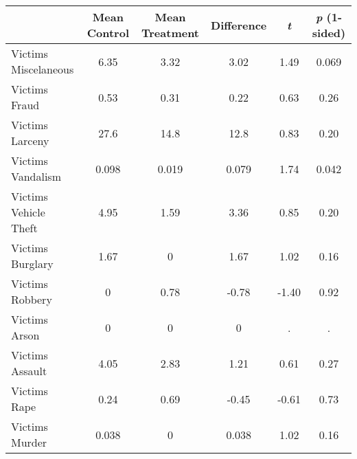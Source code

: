 {
\def\sym#1{\ifmmode^{#1}\else\(^{#1}\)\fi}
\begin{tabular}{l*{1}{ccccc}}
\hline\hline
                    &Mean Control&Mean Treatment&  Difference&  \textit{t}&\textit{p} (1-sided)\\
\hline
Victims Miscelaneous &        6.35&        3.32&        3.02&        1.49&       0.069\\
Victims Fraud       &        0.53&        0.31&        0.22&        0.63&        0.26\\
Victims Larceny     &        27.6&        14.8&        12.8&        0.83&        0.20\\
Victims Vandalism   &       0.098&       0.019&       0.079&        1.74&       0.042\\
Victims Vehicle Theft &        4.95&        1.59&        3.36&        0.85&        0.20\\
Victims Burglary    &        1.67&           0&        1.67&        1.02&        0.16\\
Victims Robbery     &           0&        0.78&       -0.78&       -1.40&        0.92\\
Victims Arson       &           0&           0&           0&           .&           .\\
Victims Assault     &        4.05&        2.83&        1.21&        0.61&        0.27\\
Victims Rape        &        0.24&        0.69&       -0.45&       -0.61&        0.73\\
Victims Murder      &       0.038&           0&       0.038&        1.02&        0.16\\
\hline\hline
\end{tabular}
}
